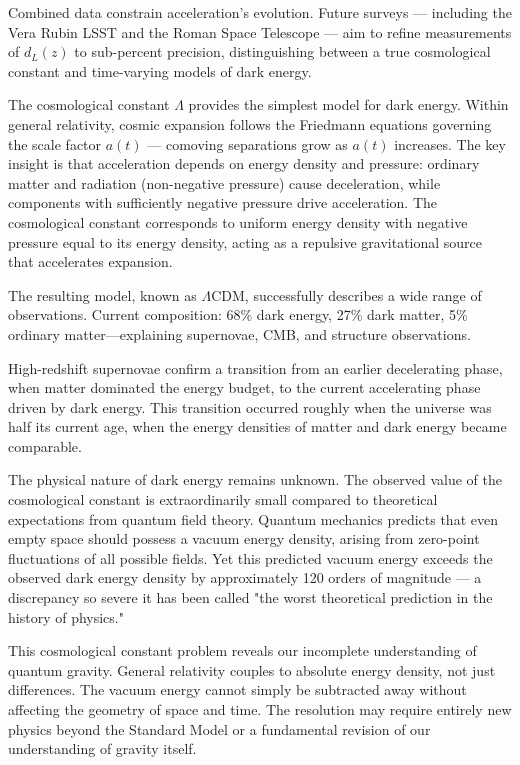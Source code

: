 Combined data constrain acceleration's evolution. Future surveys — including the Vera Rubin LSST and the Roman Space Telescope — aim to refine measurements of $d_L(z)$ to sub-percent precision, distinguishing between a true cosmological constant and time-varying models of dark energy.

The cosmological constant $\Lambda$ provides the simplest model for dark energy. Within general relativity, cosmic expansion follows the Friedmann equations governing the scale factor $a(t)$ — comoving separations grow as $a(t)$ increases. The key insight is that acceleration depends on energy density and pressure: ordinary matter and radiation (non-negative pressure) cause deceleration, while components with sufficiently negative pressure drive acceleration. The cosmological constant corresponds to uniform energy density with negative pressure equal to its energy density, acting as a repulsive gravitational source that accelerates expansion.

The resulting model, known as $\Lambda$CDM, successfully describes a wide range of observations. Current composition: 68\% dark energy, 27\% dark matter, 5\% ordinary matter—explaining supernovae, CMB, and structure observations.

High-redshift supernovae confirm a transition from an earlier decelerating phase, when matter dominated the energy budget, to the current accelerating phase driven by dark energy. This transition occurred roughly when the universe was half its current age, when the energy densities of matter and dark energy became comparable.

The physical nature of dark energy remains unknown. The observed value of the cosmological constant is extraordinarily small compared to theoretical expectations from quantum field theory. Quantum mechanics predicts that even empty space should possess a vacuum energy density, arising from zero-point fluctuations of all possible fields. Yet this predicted vacuum energy exceeds the observed dark energy density by approximately 120 orders of magnitude — a discrepancy so severe it has been called "the worst theoretical prediction in the history of physics."

This cosmological constant problem reveals our incomplete understanding of quantum gravity. General relativity couples to absolute energy density, not just differences. The vacuum energy cannot simply be subtracted away without affecting the geometry of space and time. The resolution may require entirely new physics beyond the Standard Model or a fundamental revision of our understanding of gravity itself.

